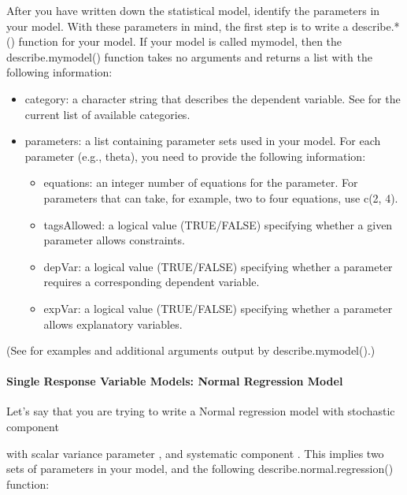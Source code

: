 \documentclass[letterpaper,10pt,english]{sphinxmanual}
\begin{document}
After you have written down the statistical model, identify the
parameters in your model. With these parameters in mind, the first step
is to write a describe.*() function for your model. If your model is
called mymodel, then the describe.mymodel() function takes no arguments
and returns a list with the following information:
\begin{itemize}
\item {} 
category: a character string that describes the dependent variable.
See for the current list of available categories.

\item {} 
parameters: a list containing parameter sets used in your model. For
each parameter (e.g., theta), you need to provide the following
information:
\begin{itemize}
\item {} 
equations: an integer number of equations for the parameter. For
parameters that can take, for example, two to four equations, use
c(2, 4).

\item {} 
tagsAllowed: a logical value (TRUE/FALSE) specifying whether a
given parameter allows constraints.

\item {} 
depVar: a logical value (TRUE/FALSE) specifying whether a
parameter requires a corresponding dependent variable.

\item {} 
expVar: a logical value (TRUE/FALSE) specifying whether a
parameter allows explanatory variables.

\end{itemize}

\end{itemize}

(See for examples and additional arguments output by
describe.mymodel().)


\paragraph{Single Response Variable Models: Normal Regression Model}
\label{docs/dev_guide:single-response-variable-models-normal-regression-model}
Let’s say that you are trying to write a Normal regression model with
stochastic component

with scalar variance parameter , and systematic
component . This implies two sets of
parameters in your model, and the following describe.normal.regression()
function:
\end{document}
